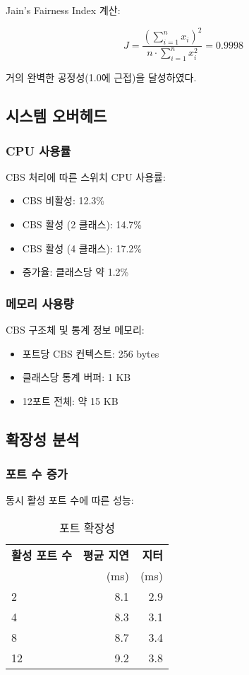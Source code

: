 \documentclass[twocolumn,10pt]{article}
\begin{document}
Jain's Fairness Index 계산:

\begin{equation}
J = \frac{(\sum_{i=1}^{n} x_i)^2}{n \cdot \sum_{i=1}^{n} x_i^2} = 0.9998
\end{equation}

거의 완벽한 공정성(1.0에 근접)을 달성하였다.

\subsection{시스템 오버헤드}

\subsubsection{CPU 사용률}

CBS 처리에 따른 스위치 CPU 사용률:

\begin{itemize}
    \item CBS 비활성: 12.3\%
    \item CBS 활성 (2 클래스): 14.7\%
    \item CBS 활성 (4 클래스): 17.2\%
    \item 증가율: 클래스당 약 1.2\%
\end{itemize}

\subsubsection{메모리 사용량}

CBS 구조체 및 통계 정보 메모리:

\begin{itemize}
    \item 포트당 CBS 컨텍스트: 256 bytes
    \item 클래스당 통계 버퍼: 1 KB
    \item 12포트 전체: 약 15 KB
\end{itemize}

\subsection{확장성 분석}

\subsubsection{포트 수 증가}

동시 활성 포트 수에 따른 성능:

\begin{table}[h]
\centering
\caption{포트 확장성}
\label{tab:port_scalability}
\begin{tabular}{lrr}
\toprule
\textbf{활성 포트 수} & \textbf{평균 지연} & \textbf{지터} \\
 & (ms) & (ms) \\
\midrule
2 & 8.1 & 2.9 \\
4 & 8.3 & 3.1 \\
8 & 8.7 & 3.4 \\
12 & 9.2 & 3.8 \\
\bottomrule
\end{tabular}
\end{table}
\end{document}
